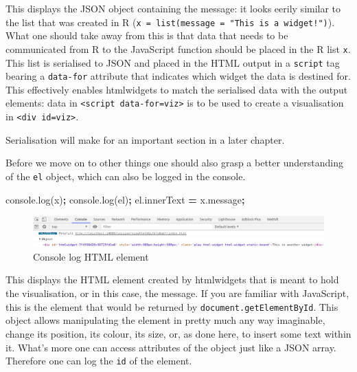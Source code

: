 \documentclass[
]{krantz}
\makeatletter
\newenvironment{Shaded}{\begin{snugshade}}{\end{snugshade}}
\newcommand{\AttributeTok}[1]{\textcolor[rgb]{0.61,0.61,0.61}{#1}}
\newcommand{\NormalTok}[1]{#1}
\newcommand{\OperatorTok}[1]{\textcolor[rgb]{0.43,0.43,0.43}{\textbf{#1}}}
\newcommand{\VariableTok}[1]{\textcolor[rgb]{0,0,0}{#1}}
\newenvironment{kframe}{%
\medskip{}
\setlength{\fboxsep}{.8em}
 \def\at@end@of@kframe{}%
 \ifinner\ifhmode%
  \def\at@end@of@kframe{\end{minipage}}%
  \begin{minipage}{\columnwidth}%
 \fi\fi%
 \def\FrameCommand##1{\hskip\@totalleftmargin \hskip-\fboxsep
 \colorbox{shadecolor}{##1}\hskip-\fboxsep
     \hskip-\linewidth \hskip-\@totalleftmargin \hskip\columnwidth}%
 \MakeFramed {\advance\hsize-\width
   \@totalleftmargin\z@ \linewidth\hsize
   \@setminipage}}%
 {\par\unskip\endMakeFramed%
 \at@end@of@kframe}
\renewenvironment{Shaded}{\begin{kframe}}{\end{kframe}}
\newenvironment{rmdblock}[1]
  {
  \begin{itemize}
  \renewcommand{\labelitemi}{
    \raisebox{-.7\height}[0pt][0pt]{
      {\setkeys{Gin}{width=3em,keepaspectratio}\texttt{[image: images/\#1]}}
    }
  }
  \setlength{\fboxsep}{1em}
  \begin{kframe}
  \item
  }
  {
  \end{kframe}
  \end{itemize}
  }
\newenvironment{rmdnote}
  {\begin{rmdblock}{note}}
  {\end{rmdblock}}
\makeatother
\begin{document}
This displays the JSON object containing the message: it looks eerily similar to the list that was created in R (\texttt{x\ =\ list(message\ =\ "This\ is\ a\ widget!")}). What one should take away from this is that data that needs to be communicated from R to the JavaScript function should be placed in the R list \texttt{x}. This list is serialised to JSON and placed in the HTML output in a \texttt{script} tag bearing a \texttt{data-for} attribute that indicates which widget the data is destined for. This effectively enables htmlwidgets to match the serialised data with the output elements: data in \texttt{\textless{}script\ data-for=\textquotesingle{}viz\textquotesingle{}\textgreater{}} is to be used to create a visualisation in \texttt{\textless{}div\ id=\textquotesingle{}viz\textquotesingle{}\textgreater{}}.

\begin{rmdnote}
Serialisation will make for an important section in a later chapter.
\end{rmdnote}

Before we move on to other things one should also grasp a better understanding of the \texttt{el} object, which can also be logged in the console.

\begin{Shaded}
\begin{Highlighting}[]
\VariableTok{console}\NormalTok{.}\AttributeTok{log}\NormalTok{(x)}\OperatorTok{;}
\VariableTok{console}\NormalTok{.}\AttributeTok{log}\NormalTok{(el)}\OperatorTok{;}
\VariableTok{el}\NormalTok{.}\AttributeTok{innerText} \OperatorTok{=} \VariableTok{x}\NormalTok{.}\AttributeTok{message}\OperatorTok{;}
\end{Highlighting}
\end{Shaded}

\begin{figure}[t]

{\centering \includegraphics[width=1\linewidth]{images/playground-console-el} 

}

\caption{Console log HTML element}\label{fig:playground-console-el}
\end{figure}

This displays the HTML element created by htmlwidgets that is meant to hold the visualisation, or in this case, the message. If you are familiar with JavaScript, this is the element that would be returned by \texttt{document.getElementById}. This object allows manipulating the element in pretty much any way imaginable, change its position, its colour, its size, or, as done here, to insert some text within it. What's more one can access attributes of the object just like a JSON array. Therefore one can log the \texttt{id} of the element.
\end{document}
